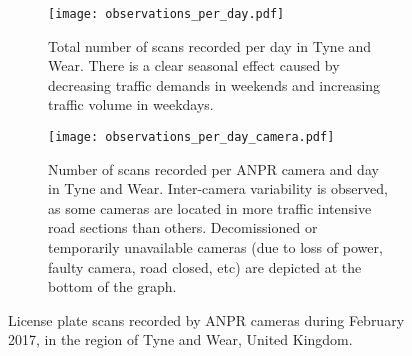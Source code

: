 \begin{figure*}[t]
\centering
\begin{subfigure}[t]{.48\textwidth}
  \centering
  \texttt{[image: observations\_per\_day.pdf]}
  \caption{Total number of scans recorded per day in Tyne and Wear. There is a clear seasonal effect caused by decreasing traffic demands in weekends and increasing traffic volume in weekdays.}
  \label{fig:observations-per-day}
\end{subfigure}\hfill
\begin{subfigure}[t]{.48\textwidth}
  \centering
  \texttt{[image: observations\_per\_day\_camera.pdf]}
  \caption{Number of scans recorded per ANPR camera and day in Tyne and Wear. Inter-camera variability is observed, as some cameras are located in more traffic intensive road sections than others. Decomissioned or temporarily unavailable cameras (due to loss of power, faulty camera, road closed, etc) are depicted at the bottom of the graph.}
  \label{fig:observations-per-camera-day}
\end{subfigure}
\caption{License plate scans recorded by ANPR cameras during February 2017, in the region of Tyne and Wear, United Kingdom.}
\label{fig:time-series}
\end{figure*}
